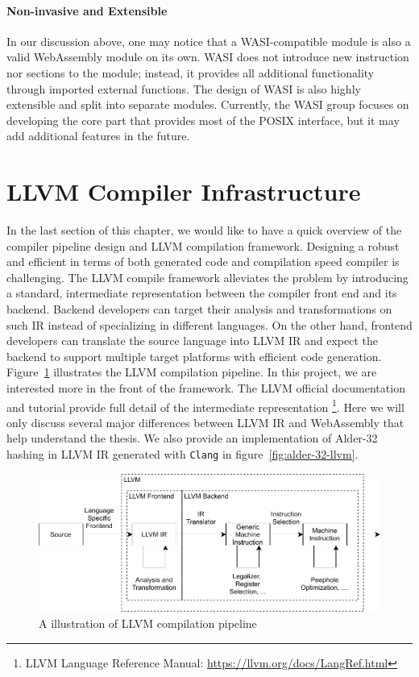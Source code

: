 \paragraph{Non-invasive and Extensible}
In our discussion above, one may notice that a WASI-compatible module is also a
valid WebAssembly module on its own. WASI does not introduce new instruction nor
sections to the module; instead, it provides all additional functionality
through imported external functions. The design of WASI is also highly
extensible and split into separate modules. Currently, the WASI group focuses
on developing the core part that provides most of the POSIX interface, but it
may add additional features in the future.

\section{LLVM Compiler Infrastructure}

In the last section of this chapter, we would like to have a quick overview of
the compiler pipeline design and LLVM compilation framework. Designing a robust
and efficient in terms of both generated code and compilation speed compiler is
challenging. The LLVM compile framework \cite{llvm-thesis} alleviates the
problem by introducing a standard, intermediate representation between the
compiler front end and its backend. Backend developers can target their analysis
and transformations on such IR instead of specializing in different languages.
On the other hand, frontend developers can translate the source language into
LLVM IR and expect the backend to support multiple target platforms with
efficient code generation. Figure~\ref{fig:llvm-intro} illustrates the LLVM
compilation pipeline. In this project, we are interested more in the
front of the framework. The LLVM official documentation and tutorial provide
full detail of the intermediate representation
\footnote{LLVM Language Reference Manual:
\url{https://llvm.org/docs/LangRef.html}}. Here we will only discuss several
major differences between LLVM IR and WebAssembly that help understand the
thesis. We also provide an implementation of Alder-32 hashing in LLVM IR
generated with \texttt{Clang} in figure~\ref{fig:alder-32-llvm}. 

\begin{figure}
  \centering
  \includegraphics{Images/llvm-intro.pdf}
  \caption{A illustration of LLVM compilation pipeline}
  \label{fig:llvm-intro}
\end{figure}

